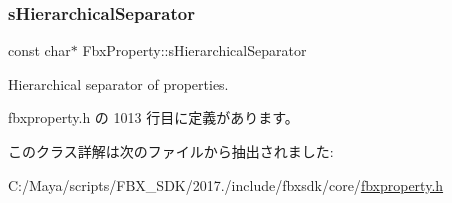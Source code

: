 \subsubsection{\texorpdfstring{s\+Hierarchical\+Separator}{sHierarchicalSeparator}}
{\footnotesize\ttfamily const char$\ast$ Fbx\+Property\+::s\+Hierarchical\+Separator\hspace{0.3cm}{\ttfamily [static]}}



Hierarchical separator of properties. 



 fbxproperty.\+h の 1013 行目に定義があります。



このクラス詳解は次のファイルから抽出されました\+:\begin{DoxyCompactItemize}
\item 
C\+:/\+Maya/scripts/\+F\+B\+X\+\_\+\+S\+D\+K/2017./include/fbxsdk/core/\hyperlink{fbxproperty_8h}{fbxproperty.\+h}\end{DoxyCompactItemize}
